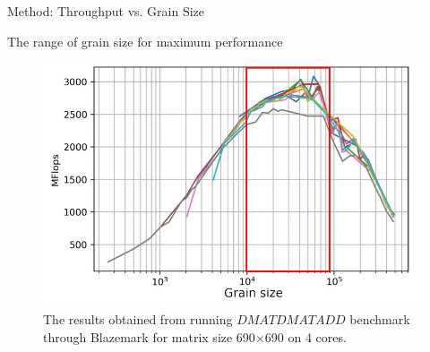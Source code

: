 \documentclass[10pt]{beamer}
\begin{document}
\begin{frame}{Method: Throughput vs. Grain Size}
	\begin{outline}		
		The range of grain size for maximum performance
		\begin{figure}[H]
			\centering\includegraphics[scale=0.9]{images/fig6_range.png}
			\caption{The results obtained from running $DMATDMATADD$ benchmark through Blazemark for matrix size 690$\times$690 on $4$ cores.}	
			\label{fig7}
		\end{figure}
		
	\end{outline}
\end{frame}
\end{document}
